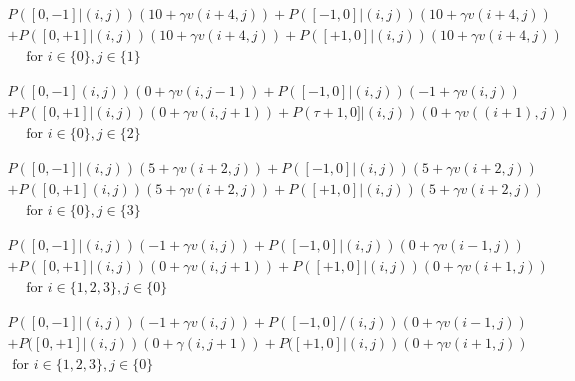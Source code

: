 \documentclass[11pt]{article}
\begin{document}
\begin{equation}
\begin{array}{c}
{P([0,-1] |(i, j))(10+\gamma v(i+4, j))+P([-1,0]|(i,j))(10+\gamma v(i+4, j))} \\
{+P([0,+1] |(i, j))(10+\gamma v(i+4, j))+P([+1,0]|(i,j))(10+\gamma v(i+4, j))} \\
{\quad \text { for } i \in\{0\}, j \in\{1\}}
\end{array}
\end{equation}

\begin{equation}
\begin{array}{c}
{P([0,-1](i, j))(0+\gamma v(i, j-1))+P([-1,0] |(i, j))(-1+\gamma v(i, j))} \\
{+P([0,+1] |(i, j))(0+\gamma v(i, j+1))+P(\tau+1,0] |(i, j))(0+\gamma v((i+1), j))} \\
{\quad \text { for } i \in\{0\}, j \in\{2\}}
\end{array}
\end{equation}

\begin{equation}
\begin{array}{c}
{P([0,-1] |(i, j))(5+\gamma v(i+2, j))+P([-1,0] |(i, j))(5+\gamma v(i+2, j))} \\
{+P([0,+1](i, j))(5+\gamma v(i+2, j))+P([+1,0] |(i, j))(5+\gamma v(i+2, j))} \\
{\quad \text { for } i \in\{0\}, j \in\{3\}}
\end{array}
\end{equation}

\begin{equation}
\begin{array}{c}
{P([0,-1] |(i, j))(-1+\gamma v(i, j))+P([-1,0] |(i, j))(0+\gamma v(i-1, j))} \\
{+P([0,+1] |(i, j))(0+\gamma v(i, j+1))+P([+1,0] |(i, j))(0+\gamma v(i+1, j))} \\
{\quad \text { for } i \in\{1,2,3\}, j \in\{0\}}
\end{array}
\end{equation}

\begin{equation}
\begin{array}{c}
{P([0,-1]|(i, j))(-1+\gamma v(i, j))+P([-1,0] /(i, j))(0+\gamma v(i-1, j))}\\
{\left.\left.+P(\left[0,+1\right] |(i, j)\right)(0+\gamma(i, j+1))+P([+1,0] |(i, j)\right)(0+\gamma v(i+1, j))}\\
{\text { for } i \in\{1,2,3\}, j \in\{0\}}
\end{array}
\end{equation}
\end{document}
